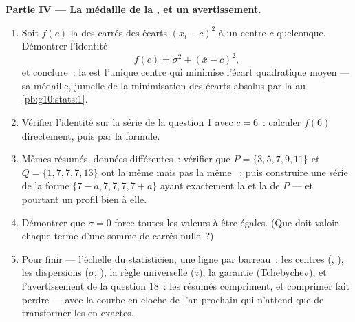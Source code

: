 \begin{problem}
\medskip
\noindent\textbf{Partie IV --- La médaille de la , et un
avertissement.}
\begin{enumerate}[resume]
  \item Soit $f(c)$ la  des carrés des écarts $(x_i - c)^2$ à
        un centre $c$ quelconque. Démontrer l'identité
        \[
        f(c) = \sigma^2 + (\bar x - c)^2 ,
        \]
        et conclure~: la  est l'unique centre qui minimise
        l'écart quadratique moyen --- sa médaille, jumelle de la
        minimisation des écarts absolus par la  au
        \cref{pb:g10:stats:1}.
  \item Vérifier l'identité sur la série de la question 1 avec
        $c = 6$~: calculer $f(6)$ directement, puis par la formule.
  \item Mêmes résumés, données différentes~: vérifier que
        $P = \{3, 5, 7, 9, 11\}$ et $Q = \{1, 7, 7, 7, 13\}$ ont la
        même  mais pas la même ~; puis construire une
        série de la forme $\{7 - a, 7, 7, 7, 7 + a\}$ ayant
        exactement la  et la  de $P$ --- et pourtant
        un profil bien à elle.
  \item Démontrer que $\sigma = 0$ force toutes les valeurs à être
        égales. (Que doit valoir chaque terme d'une somme de carrés
        nulle~?)
  \item Pour finir --- l'échelle du statisticien, une ligne par
        barreau~: les centres (, ), les dispersions
        ($\sigma$, ), la règle universelle ($z$),
        la garantie (Tchebychev), et l'avertissement de la question
        18~: les résumés compriment, et comprimer fait perdre ---
        avec la courbe en cloche de l'an prochain qui n'attend que
        de transformer les  en  exactes.
\end{enumerate}
\end{problem}
